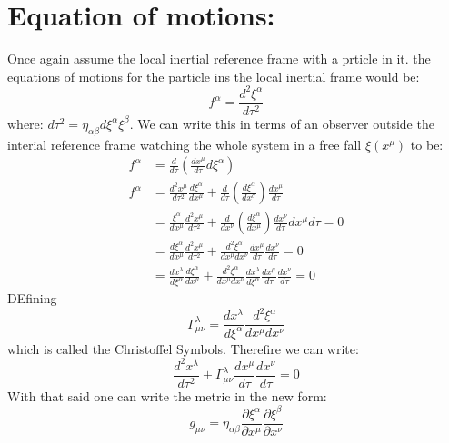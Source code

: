 \documentclass[10pt,a4paper]{article}
\begin{document}
     \section{Equation of motions:}
     Once again assume the local inertial reference frame with a prticle in it. the equations of motions for the particle ins the local inertial frame would be:
     \begin{equation}
          f^\alpha = \frac{d^2\xi^\alpha}{d\tau^2}
     \end{equation}
     where: $d\tau^2 = \eta_{\alpha\beta}d\xi^\alpha \xi^\beta$. We can write this in terms of an observer outside the interial reference frame watching the whole system in a free fall $\xi(x^\mu)$ to be:
     \begin{align}
          f^\alpha &= \frac{d}{d\tau}\left(\frac{dx^{\mu}}{d\tau}{d\xi^{\alpha}}\right)\\
          f^\alpha &= \frac{d^2 x^\mu}{d\tau^2}\frac{d\xi^\alpha}{dx^\mu} + \frac{d}{d\tau}(\frac{d\xi^\alpha}{dx^\sigma})\frac{dx^\mu}{d\tau}\\
          &= \frac{\xi^\alpha}{dx^\mu}\frac{d^2 x^\mu}{d\tau^2}+\frac{d}{dx^\nu}(\frac{d\xi^\alpha}{dx^\mu})\frac{dx^\nu}{d\tau}{dx^\mu}{d\tau} = 0\\
          &= \frac{d\xi^\alpha}{dx^\mu}\frac{d^2x^\mu}{d\tau^2}+ \frac{d^2\xi^\alpha}{dx^\mu dx^\nu} \frac{dx^\mu}{d\tau}\frac{dx^\nu}{d\tau} =0\\
          &=\frac{dx^\lambda}{d\xi^\alpha}\frac{d\xi^\alpha}{dx^\mu} + \frac{d^2\xi^\alpha}{dx^\mu dx^\nu}\frac{dx^\lambda}{d\xi^\alpha}\frac{dx^\mu}{d\tau}\frac{dx^\nu}{d\tau} = 0
     \end{align}
     DEfining
     \begin{equation}
          \Gamma^\lambda_{\mu\nu} = \frac{dx^\lambda}{d\xi^\alpha}{\frac{d^2 \xi^\alpha}{dx^\mu dx^\nu}}
     \end{equation}
     which is called the Christoffel Symbols. Therefire we can write:
     \begin{equation}
          \frac{d^2x^\lambda}{d\tau^2} + \Gamma^\lambda_{\mu\nu} \frac{dx^\mu}{d\tau}\frac{dx^\nu}{d\tau} = 0
     \end{equation}
     With that said one can write the metric in the new form:
     \begin{equation}
          g_{\mu\nu} = \eta_{\alpha\beta}\frac{\partial\xi^\alpha}{\partial x^\mu}\frac{\partial\xi^\beta}{\partial x^\nu}
     \end{equation}
\end{document}
